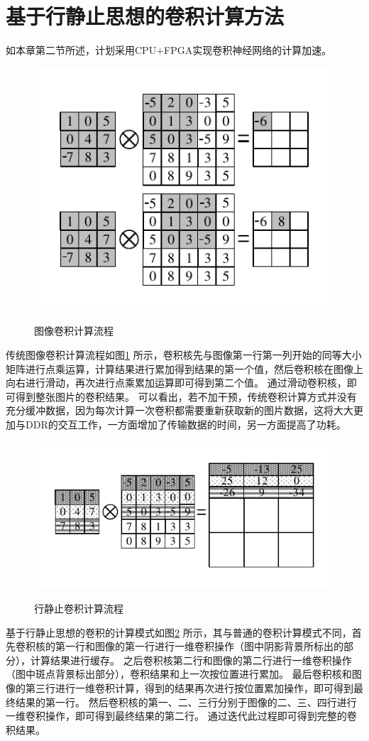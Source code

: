 \section{基于行静止思想的卷积计算方法}
如本章第二节所述，计划采用CPU+FPGA实现卷积神经网络的计算加速。
\begin{figure}[h]
    \centering
    \includegraphics{../pdf/tra_conv.pdf}\\
    \caption{图像卷积计算流程}
    \label{tra_conv}
\end{figure}
传统图像卷积计算流程如图\ref{tra_conv} 所示，卷积核先与图像第一行第一列开始的同等大小矩阵进行点乘运算，计算结果进行累加得到结果的第一个值，然后卷积核在图像上向右进行滑动，再次进行点乘累加运算即可得到第二个值。
通过滑动卷积核，即可得到整张图片的卷积结果。
可以看出，若不加干预，传统卷积计算方式并没有充分缓冲数据，因为每次计算一次卷积都需要重新获取新的图片数据，这将大大更加与DDR的交互工作，一方面增加了传输数据的时间，另一方面提高了功耗。

\begin{figure}[h]
    \centering
    \includegraphics{../pdf/row_conv.pdf}\\
    \caption{行静止卷积计算流程}
    \label{row_conv}
\end{figure}
基于行静止思想的卷积的计算模式如图\ref{row_conv} 所示，其与普通的卷积计算模式不同，首先卷积核的第一行和图像的第一行进行一维卷积操作（图中阴影背景所标出的部分），计算结果进行缓存。
之后卷积核第二行和图像的第二行进行一维卷积操作（图中斑点背景标出部分），卷积结果和上一次按位置进行累加。
最后卷积核和图像的第三行进行一维卷积计算，得到的结果再次进行按位置累加操作，即可得到最终结果的第一行。
然后卷积核的第一、二、三行分别于图像的二、三、四行进行一维卷积操作，即可得到最终结果的第二行。
通过迭代此过程即可得到完整的卷积结果。

